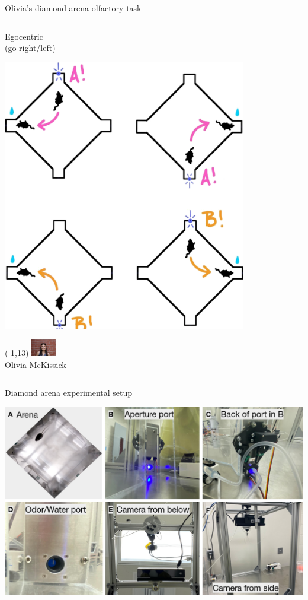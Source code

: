 \documentclass[bigger]{beamer}
\begin{document}
\begin{frame}[label={sec:orgbbaad3c}]{Olivia's diamond arena olfactory task}
\begin{columns}
\begin{column}[t]{0.5\columnwidth}
\center
Egocentric\\
(go right/left)
\begin{center}
\includegraphics[width=0.8\textwidth]{img/egocentric-task.png}
\end{center}

\begin{textblock}{5}(-1,13)
\center
\includegraphics[width=3em]{img/olivia.jpg}\\
\scriptsize
Olivia McKissick
\end{textblock}
\end{column}
\end{columns}
\end{frame}

\begin{frame}[label={sec:orgad6fe7e}]{Diamond arena experimental setup}
\begin{center}
\includegraphics[width=.9\linewidth]{img/physical-diamond-arena.png}
\end{center}
\end{frame}
\end{document}
